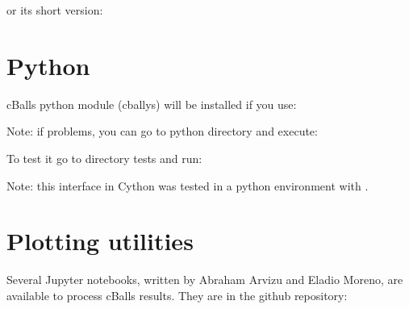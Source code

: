 \documentclass[letterpaper,10pt,english]{sphinxmanual}
\begin{document}
\begin{sphinxVerbatim}[commandchars=\\\{\}]
 
\end{sphinxVerbatim}

\sphinxAtStartPar
or its short version:

\begin{sphinxVerbatim}[commandchars=\\\{\}]
 
\end{sphinxVerbatim}


\section{Python}
\label{\detokenize{overview:python}}
\sphinxAtStartPar
cBalls python module (cballys) will be installed if you use:

\begin{sphinxVerbatim}[commandchars=\\\{\}]
   
\end{sphinxVerbatim}

\sphinxAtStartPar
Note: if problems, you can go to python directory and execute:

\begin{sphinxVerbatim}[commandchars=\\\{\}]
  
   
\end{sphinxVerbatim}

\sphinxAtStartPar
To test it go to directory tests and \textquotesingle{}run\textquotesingle{}:

\begin{sphinxVerbatim}[commandchars=\\\{\}]
 
\end{sphinxVerbatim}

\sphinxAtStartPar
Note: this interface in Cython was tested in a python environment with .


\section{Plotting utilities}
\label{\detokenize{overview:plotting-utilities}}
\sphinxAtStartPar
Several Jupyter notebooks, written by Abraham Arvizu and Eladio Moreno, are available to process cBalls results. They are in the github repository:
\end{document}
